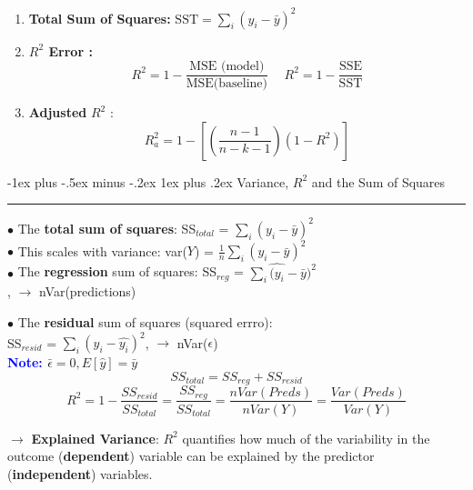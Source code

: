 \documentclass[letterpaper, 10.5pt,landscape]{article}
\makeatletter
\renewcommand{\subsubsection}{\@startsection{subsubsection}{3}{0mm}%
                                {-1ex plus -.5ex minus -.2ex}%
                                {1ex plus .2ex}%
                                {\normalfont\small\bfseries}}
\makeatother
\begin{document}
\begin{multicols*}{3}
\begin{enumerate}
    \item \textbf{Total Sum of Squares:} \(\boxed{\text{SST} = \sum_{i} (y_{i} - \bar{y})^{2}}\)
    
    \item \textbf{$R^{2}$ Error : }  
    \vspace{-3pt}
    \[\boxed{R^{2} = 1 - \frac{\text{MSE (model)}}{\text{MSE(baseline)}}} \hspace{15pt} \boxed{R^{2} = 1 - \frac{\text{SSE}}{\text{SST}}} \] 
    
    
    \item \textbf{Adjusted} $R^{2}$ :
    \vspace{-3pt}
    \[\boxed{R^{2}_{a} =  1 - \left[ \left( \frac{n-1}{n-k-1} \right) (1-R^{2})   \right]} \] 
\end{enumerate}

\subsubsection{Variance, \texorpdfstring{\(R^{2}\)}, and the Sum of Squares}  {\color{teal}\hrule height 0.5pt} \smallskip

$\bullet$ The \textbf{total sum of squares}: SS$_{total}$ = \(\sum_{i} (y_{i} - \bar{y})^{2} \) \\

$\bullet$ This scales with variance: var($Y$) = \( \frac{1}{n} \sum_{i} (y_{i} - \bar{y})^{2} \) \\

$\bullet$ The \textbf{regression} sum of squares: SS$_{reg}$ = \(\sum_{i} \hat{(y_{i}} - \bar{y})^{2} \) \\ , $\rightarrow$ nVar(predictions)

$\bullet$ The \textbf{residual} sum of squares (squared errro): \\ 
SS$_{resid}$ = \(\sum_{i} (y_{i} - \hat{y_{i}})^{2} \), $\rightarrow$ nVar($\epsilon$) \\

\textbf{\textcolor{blue}{Note: }} \(\bar{\epsilon} = 0, E[\hat{y}] = \bar{y} \)
\vspace{-3pt}
\[SS_{total} = SS_{reg} + SS_{resid} \]
\vspace{-3pt}
\[R^{2} = 1 - \frac{SS_{resid}}{SS_{total}} = \frac{SS_{reg}}{SS_{total}} = \frac{nVar(Preds)}{nVar(Y)} = \frac{Var(Preds)}{Var(Y)}\]
\vspace{-3pt}

$\rightarrow$  \textbf{Explained Variance}: $R^{2}$ quantifies how much of the variability in the outcome (\textbf{dependent}) variable can be explained by the predictor (\textbf{independent}) variables. 


\end{multicols*}
\end{document}
